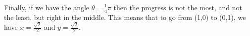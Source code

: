 \documentclass[preview]{standalone}
\begin{document}
\begin{center}
Finally, if we have the angle $\theta = \frac{1}{4} \pi$ then the progress is not the most, and not the least, but right in the middle. This means that to go from (1,0) to (0,1), we have $x=\frac{\sqrt{2}}{2}$ and $y=\frac{\sqrt{2}}{2}$.
\end{center}
\end{document}
